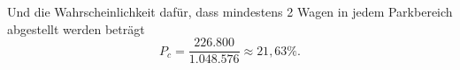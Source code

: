 \documentclass[main.tex]{subfiles}
\begin{document}
Und die Wahrscheinlichkeit dafür, dass mindestens 2 Wagen in jedem Parkbereich abgestellt werden beträgt $$
    P_c = \frac{226.800}{1.048.576} \approx 21,63\%.
$$

%
\end{document}
